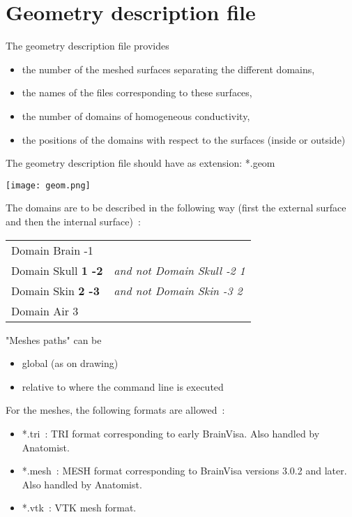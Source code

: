 \section{Geometry description file}
\label{sec:geom}
\noindent
The geometry description file provides 
	\begin{itemize}
		\item the number of the meshed surfaces separating the different domains,
		\item  the names of the files corresponding to these surfaces, 
		\item the number of domains of homogeneous conductivity,
		\item the positions of the domains with respect to the surfaces (inside or outside)
	\end{itemize}
The geometry description file should have as extension: *.geom 

\centerline{\texttt{[image: geom.png]}}

\begin{note}
    	The domains are to be described in the following way (first the external surface and then the internal surface)~:

    \begin{tabular}{ll}
        Domain Brain -1              & \\
        Domain Skull \textbf{1 -2}	 &	\emph{and not Domain Skull -2 1} \\
        Domain Skin \textbf{2 -3}	 &	\emph{and not Domain Skin -3 2}  \\
        Domain Air 3                 &  \\
    \end{tabular}
\end{note}

\medskip

\begin{note}
    "Meshes paths" can be  
    \begin{itemize}
        \item global (as on drawing)
        \item relative to where the command line is executed
    \end{itemize}
    For the meshes, the following formats are allowed~:
    \begin{itemize}
        \item *.tri~: TRI format corresponding to early BrainVisa. Also handled by Anatomist.
        \item *.mesh~: MESH format corresponding to BrainVisa versions 3.0.2 and later. Also handled by Anatomist.
        \item *.vtk~: VTK mesh format.
    \end{itemize}
\end{note}

